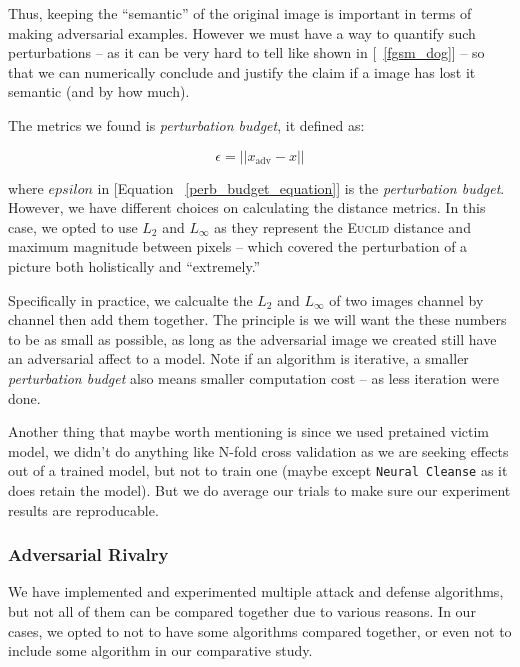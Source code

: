 \documentclass[11pt]{article}
\newcommand{\ilc}{\texttt}
\begin{document}
Thus, keeping the ``semantic'' of the original image is important in terms of making adversarial examples. However we must have a way to quantify such perturbations -- as it can be very hard to tell like shown in [\figurename{\ \ref{fgsm_dog}}] \cite{cite:google_fgsm} -- so that we can numerically conclude and justify the claim if a image has lost it semantic (and by how much).

The metrics we found is \textit{perturbation budget}\cite{cite:perb_budget}, it defined as:

\begin{equation}
     \epsilon = || x_{\text{adv}} - x ||
     \label{perb_budget_equation}
\end{equation}

where $epsilon$ in [Equation \ \ref{perb_budget_equation}] is the \textit{perturbation budget}. However, we have different choices on calculating the distance metrics. In this case, we opted to use $L_2$ and $L_{\infty}$ as they represent the \textsc{Euclid} distance and maximum magnitude between pixels -- which covered the perturbation of a picture both holistically and ``extremely.''

Specifically in practice, we calcualte the $L_2$ and $L_{\infty}$ of two images channel by channel then add them together. The principle is we will want the these numbers to be as small as possible, as long as the adversarial image we created still have an adversarial affect to a model. Note if an algorithm is iterative, a smaller \textit{perturbation budget} also means smaller computation cost -- as less iteration were done.\newline

\noindent Another thing that maybe worth mentioning is since we used pretained victim model, we didn't do anything like N-fold cross validation as we are seeking effects out of a trained model, but not to train one (maybe except \ilc{Neural Cleanse} as it does retain the model). But we do average our trials to make sure our experiment results are reproducable.


\subsubsection{Adversarial Rivalry}

We have implemented and experimented multiple attack and defense algorithms, but not all of them can be compared together due to various reasons. In our cases, we opted to not to have some algorithms compared together, or even not to include some algorithm in our comparative study.
\end{document}
